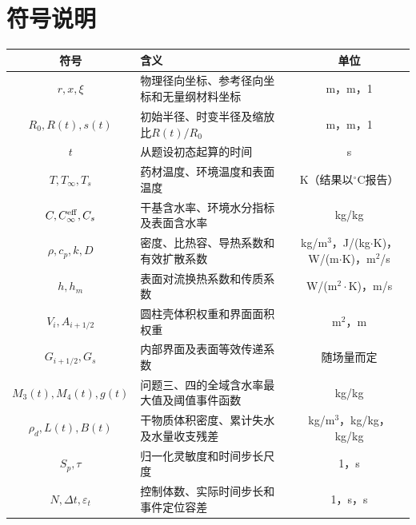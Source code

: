 \documentclass[UTF8,a4paper,zihao=-4,fontset=fandol]{ctexart}
\begin{document}
\section{符号说明}
\label{sec:notation}
\begin{center}
\renewcommand{\arraystretch}{1.3}
\small
\begin{tabularx}{0.95\textwidth}{c >{\raggedright\arraybackslash}X c}
\toprule
符号 & 含义 & 单位 \\
\midrule
$r,x,\xi$ & 物理径向坐标、参考径向坐标和无量纲材料坐标 & m，m，1\\
$R_0,R(t),s(t)$ & 初始半径、时变半径及缩放比$R(t)/R_0$ & m，m，1\\
$t$ & 从题设初态起算的时间 & s\\
$T,T_\infty,T_s$ & 药材温度、环境温度和表面温度 & K（结果以$^\circ$C报告）\\
$C,C_\infty^{\rm eff},C_s$ & 干基含水率、环境水分指标及表面含水率 & kg/kg\\
$\rho,c_p,k,D$ & 密度、比热容、导热系数和有效扩散系数 & kg/m$^3$，J/(kg$\cdot$K)，W/(m$\cdot$K)，m$^2$/s\\
$h,h_m$ & 表面对流换热系数和传质系数 & W/(m$^2\cdot$K)，m/s\\
$V_i,A_{i+1/2}$ & 圆柱壳体积权重和界面面积权重 & m$^2$，m\\
$G_{i+1/2},G_s$ & 内部界面及表面等效传递系数 & 随场量而定\\
$M_3(t),M_4(t),g(t)$ & 问题三、四的全域含水率最大值及阈值事件函数 & kg/kg\\
$\rho_d,L(t),B(t)$ & 干物质体积密度、累计失水及水量收支残差 & kg/m$^3$，kg/kg，kg/kg\\
$S_p,\tau$ & 归一化灵敏度和时间步长尺度 & 1，s\\
$N,\Delta t,\varepsilon_t$ & 控制体数、实际时间步长和事件定位容差 & 1，s，s\\
\bottomrule
\end{tabularx}
\end{center}
\end{document}
